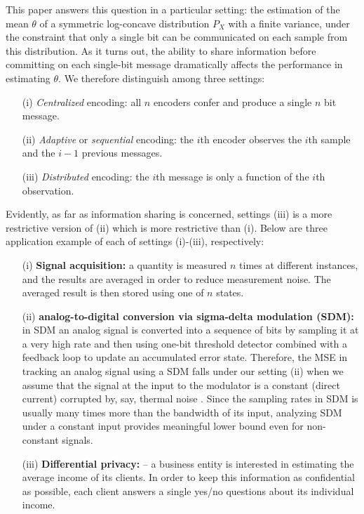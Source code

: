 \documentclass[letterpaper, conference, 11pt]{IEEEtran}      %
\begin{document}
This paper answers this question in a particular setting: the estimation of the mean $\theta$ of a symmetric log-concave distribution $P_X$ with a finite variance, under the constraint that only a single bit can be communicated on each sample from this distribution. As it turns out, the ability to share information before committing on each single-bit message dramatically affects the performance in estimating $\theta$. We therefore distinguish among three settings:
\begin{itemize}
 \item[(i)] \emph{Centralized} encoding: all $n$ encoders confer and produce a single $n$ bit message. 
 \item[(ii)] \emph{Adaptive} or \emph{sequential} encoding: the $i$th encoder observes the $i$th sample and the $i-1$ previous messages.
 \item[(iii)] \emph{Distributed} encoding: the $i$th message is only a function of the $i$th observation.
 \end{itemize}
Evidently, as far as information sharing is concerned, settings (iii) is a more restrictive version of (ii) which is more restrictive than (i). Below are three application example of each of settings (i)-(iii), respectively:
\begin{itemize}
\item[(i)] {\bf Signal acquisition:} a quantity is measured $n$ times at different instances, and the results are averaged in order to reduce measurement noise. The averaged result is then stored using one of $n$ states. 
\item[(ii)] {\bf analog-to-digital conversion via sigma-delta modulation (SDM):} in SDM an analog signal is converted into a sequence of bits by sampling it at a very high rate and then using one-bit threshold detector combined with a feedback loop to update an accumulated error state. Therefore, the MSE in tracking an analog signal using a SDM falls under our setting (ii) when we assume that the signal at the input to the modulator is a constant (direct current) corrupted by, say, thermal noise \cite{53738}. Since the sampling rates in SDM is usually many times more than the bandwidth of its input, analyzing SDM under a constant input provides meaningful lower bound even for non-constant signals.
\item[(iii)] {\bf Differential privacy:} -- a business entity is interested in estimating the average income of its clients. In order to keep this information as confidential as possible, each client answers a single yes/no questions about its individual income. 
\end{itemize}
\end{document}
